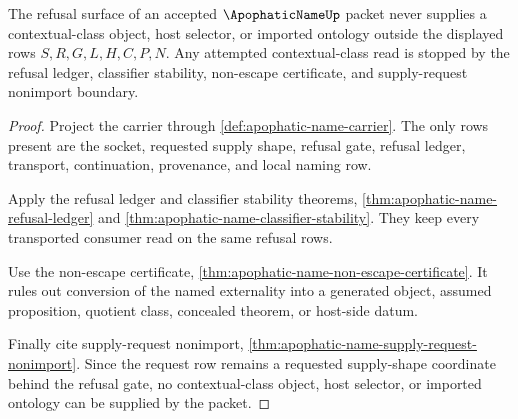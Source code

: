 \begin{theorem}
\label{thm:apophatic-name-contextual-class-nonescape}
The refusal surface of an accepted $\ApophaticNameUp$ packet never supplies a contextual-class object, host selector, or imported ontology outside the displayed rows $S,R,G,L,H,C,P,N$. Any attempted contextual-class read is stopped by the refusal ledger, classifier stability, non-escape certificate, and supply-request nonimport boundary.
\end{theorem}
\begin{proof}
Project the carrier through \autoref{def:apophatic-name-carrier}. The only rows present are the socket, requested supply shape, refusal gate, refusal ledger, transport, continuation, provenance, and local naming row.

Apply the refusal ledger and classifier stability theorems, \autoref{thm:apophatic-name-refusal-ledger} and \autoref{thm:apophatic-name-classifier-stability}. They keep every transported consumer read on the same refusal rows.

Use the non-escape certificate, \autoref{thm:apophatic-name-non-escape-certificate}. It rules out conversion of the named externality into a generated object, assumed proposition, quotient class, concealed theorem, or host-side datum.

Finally cite supply-request nonimport, \autoref{thm:apophatic-name-supply-request-nonimport}. Since the request row remains a requested supply-shape coordinate behind the refusal gate, no contextual-class object, host selector, or imported ontology can be supplied by the packet.
\end{proof}

